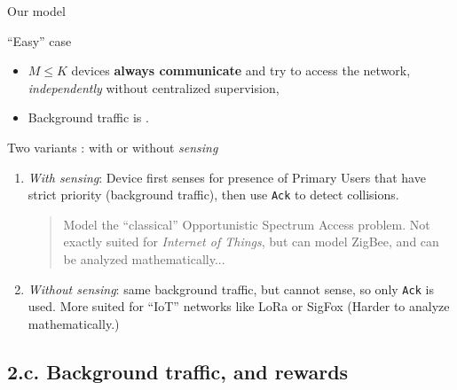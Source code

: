 \documentclass[12pt,english,ignorenonframetext,aspectratio=169,]{beamer}
\providecommand{\tightlist}{%
  \setlength{\itemsep}{0pt}\setlength{\parskip}{0pt}}
\begin{document}
\begin{frame}[fragile]{Our model}

\begin{block}{``Easy'' case}

\begin{itemize}
\tightlist
\item
  \(M \leq K\) devices \textbf{always communicate} and try to access the
  network, \emph{independently} without centralized supervision,
\item
  Background traffic is \iid.
\end{itemize}

\end{block}

\begin{block}{Two variants : with or without \emph{sensing}}

\begin{enumerate}
\def\labelenumi{\arabic{enumi}.}
\tightlist
\item
  \emph{With sensing}: Device first senses for presence of Primary Users that have strict priority
  (background traffic), then use \texttt{Ack} to detect collisions.

  \begin{quote}
  \small{Model the ``classical'' Opportunistic Spectrum Access problem.
  Not exactly suited for \emph{Internet of Things}, but can model ZigBee, and can be analyzed mathematically...}
  \end{quote}
\item
  \emph{Without sensing}: same background traffic, but cannot sense, so
  only \texttt{Ack} is used.
  \small{More suited for ``IoT'' networks like LoRa or SigFox} (Harder to
  analyze mathematically.)
\end{enumerate}

\end{block}

\end{frame}



\subsection{\hfill{}2.c. Background traffic, and rewards\hfill{}}
\end{document}
